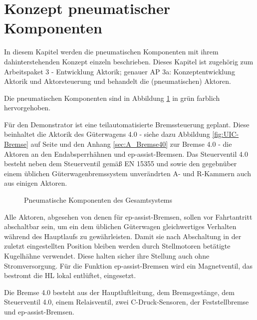 \section{Konzept pneumatischer Komponenten} \label{sec:pKomp}
In diesem Kapitel werden die pneumatischen Komponenten mit ihrem dahinterstehenden Konzept einzeln beschrieben. Dieses Kapitel ist zugehörig zum Arbeitspaket 3 - Entwicklung Aktorik; genauer AP 3a: Konzeptentwicklung Aktorik und Aktorsteuerung und behandelt die (pneumatischen) Aktoren.\par
Die pneumatischen Komponenten sind in Abbildung \ref{fig:pKomp} in grün farblich hervorgehoben.\par
Für den \gls{Demonstrator} ist eine teilautomatisierte Bremssteuerung geplant. Diese beinhaltet die Aktorik des Güterwagens 4.0 - siehe dazu Abbildung \ref{fig:UIC-Bremse} auf Seite \pageref{fig:UIC-Bremse} und den Anhang \ref{sec:A_Bremse40} zur \gls{Bremse 4.0} - die Aktoren an den Endabsperrhähnen und \gls{ep-assist-Bremsen}. Das Steuerventil 4.0 besteht neben dem  Steuerventil gemäß EN 15355 und sowie den gegebnüber einem üblichen Güterwagenbremssystem unverändrten A- und R-Kammern auch aus einigen Aktoren.\par
\begin{figure}[hbt]
    \centering
    
    \caption{Pneumatische Komponenten des Gesamtsystems}
    \label{fig:pKomp}
\end{figure}
Alle Aktoren, abgesehen von denen für \gls{ep-assist-Bremsen}, sollen vor Fahrtantritt abschaltbar sein, um ein dem üblichen Güterwagen gleichwertiges Verhalten während des Hauptlaufs zu gewährleisten. Damit sie nach Abschaltung in der zuletzt eingestellten Position bleiben werden durch Stellmotoren  betätigte Kugelhähne verwendet. Diese halten sicher ihre Stellung auch ohne Stromversorgung. Für die Funktion \gls{ep-assist-Bremsen} wird ein Magnetventil, das bestromt die HL lokal entlüftet, eingesetzt.\par
Die \gls{Bremse 4.0} besteht aus der Hauptluftleitung, dem Bremsgestänge, dem Steuerventil 4.0, einem Relaisventil, zwei C-Druck-Sensoren, der Feststellbremse und \gls{ep-assist-Bremsen}.\par
